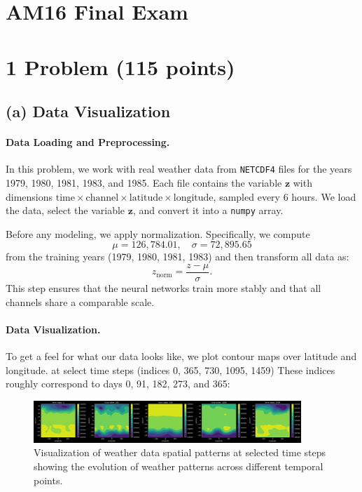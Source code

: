 \documentclass{article}
\begin{document}
\section*{AM16 Final Exam}

\section*{1 Problem (115 points)}

\subsection*{(a) Data Visualization}

\paragraph{Data Loading and Preprocessing.}
In this problem, we work with real weather data from \texttt{NETCDF4} files for the years 1979, 1980, 1981, 1983, and 1985. Each file contains the variable \(\mathbf{z}\) with dimensions \(\text{time} \times \text{channel} \times \text{latitude} \times \text{longitude}\), sampled every 6 hours. We load the data, select the variable \(\mathbf{z}\), and convert it into a \texttt{numpy} array.

Before any modeling, we apply normalization. Specifically, we compute
\[
\mu = 126{,}784.01, \quad \sigma = 72{,}895.65
\]
from the training years (1979, 1980, 1981, 1983) and then transform all data as:
\[
z_{\text{norm}} = \frac{z - \mu}{\sigma}.
\]
This step ensures that the neural networks train more stably and that all channels share a comparable scale.

\paragraph{Data Visualization.}
To get a feel for what our data looks like, we plot contour maps over latitude and longitude. at select time steps (indices 0, 365, 730, 1095, 1459) These indices roughly correspond to days 0, 91, 182, 273, and 365:

\begin{figure}[h]
    \centering
    \includegraphics[width=0.9\textwidth]{../plots/visualized_data.png}
    \caption{Visualization of weather data spatial patterns at selected time steps showing the evolution of weather patterns across different temporal points.}
    \label{fig:weather_vis}
\end{figure}
\end{document}
